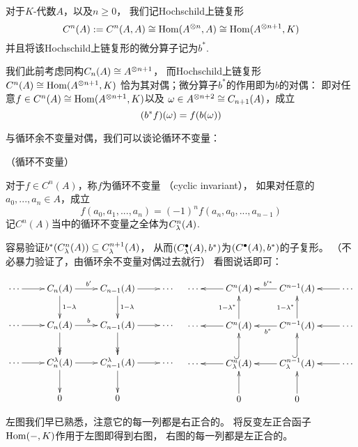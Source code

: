 \begin{notation}对于$K$-代数$A$，以及$n\geq0$，
我们记Hochschild上链复形
$$C^n(A):=C^{n}(A,A)\cong\operatorname{Hom}(A^{\otimes n},A)
\cong\operatorname{Hom}(A^{\otimes n+1},K)$$
并且将该Hochschild上链复形的微分算子记为$b^*$.
\end{notation}

我们此前考虑同构$C_n(A)\cong A^{\otimes n+1}$，
而Hochschild上链复形$C^n(A)\cong\operatorname{Hom}(A^{\otimes n+1},K)$
恰为其对偶；微分算子$b^*$的作用即为$b$的对偶：
即对任意$f\in C^n(A)\cong\operatorname{Hom}(A^{\otimes n+1},K)$以及
$\omega\in A^{\otimes n+2}\cong C_{n+1}(A)$，成立
$$(b^*f)(\omega)=f(b(\omega))$$

与循环余不变量对偶，我们可以谈论循环不变量：

\begin{definition}（循环不变量）

对于$f\in C^n(A)$，称$f$为循环不变量
（cyclic invariant），
如果对任意的$a_0,...,a_n\in A$，成立
$$f(a_0,a_1,...,a_n)=(-1)^nf(a_n,a_0,...,a_{n-1})$$
记$C^n(A)$当中的循环不变量之全体为$C^n_{\lambda}(A)$.
\end{definition}

容易验证$b^*(C^{n}_{\lambda}(A))\subseteq C^{n+1}_{\lambda}(A)$，
从而$(C^{\bullet}_{\lambda}(A),b^*)$为$(C^{\bullet}(A),b^*)$的子复形。
（不必暴力验证了，由循环余不变量对偶过去就行）
看图说话即可：

$$
  \xymatrix{
     \cdots       \ar[r]
    &C_n(A)       \ar[r]^{b'}   \ar[d]^{1-\lmd}
    &C_{n-1}(A)   \ar[r]        \ar[d]^{1-\lmd}
    &\cdots
  \\
     \cdots       \ar[r]
    &C_n(A)       \ar[r]^{b }   \ar@{->>}[d]
    &C_{n-1}(A)   \ar[r]        \ar@{->>}[d]
    &\cdots
  \\
     \cdots       \ar[r]
    &C_n^{\lmd}(A)\ar[r]        \ar[d]
    &C_{n-1}^{\lmd}(A) \ar[r]   \ar[d]     
    &\cdots
  \\
    &0&0&
  }
\quad
  \xymatrix{
     \cdots       
    &C^n(A)       \ar[l]        
    &C^{n-1}(A)   \ar[l]_{b'^*} 
    &\cdots       \ar[l]
  \\
     \cdots       
    &C^n(A)       \ar[l]        \ar[u]^{1-\lmd^*}
    &C^{n-1}(A)   \ar[l]^{b^*}  \ar[u]^{1-\lmd^*}
    &\cdots       \ar[l]
  \\
     \cdots       
    &C^n_{\lmd}(A)\ar[l]        \ar@{^{(}->}[u]
    &C^{n-1}_{\lmd}(A) \ar[l]   \ar@{^{(}->}[u]
    &\cdots            \ar[l] 
  \\
    &0\ar[u]
    &0\ar[u]
    &
  }
$$

左图我们早已熟悉，注意它的每一列都是右正合的。
将反变左正合函子$\operatorname{Hom}(-,K)$作用于左图即得到右图，
右图的每一列都是左正合的。


